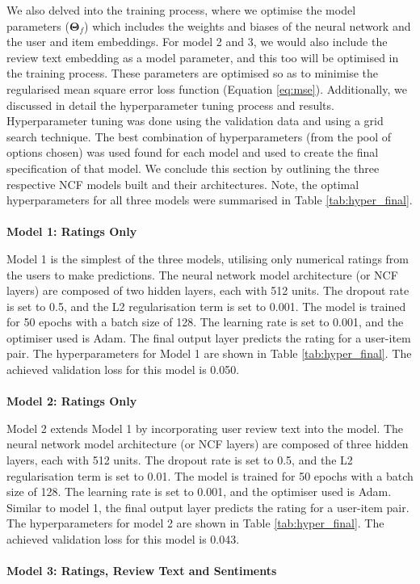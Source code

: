 We also delved into the training process, where we optimise the model parameters ($\boldsymbol{\Theta}_f$) which includes the weights and biases of the neural network and the user and item embeddings. For model 2 and 3, we would also include the review text embedding as a model parameter, and this too will be optimised in the training process. These parameters are optimised so as to minimise the regularised mean square error loss function (Equation \ref{eq:mse}). Additionally, we discussed in detail the hyperparameter tuning process and results. Hyperparameter tuning was done using the validation data and using a grid search technique. The best combination of hyperparameters (from the pool of options chosen) was used found for each model and used to create the final specification of that model. We conclude this section by outlining the three respective NCF models built and their architectures. Note, the optimal hyperparameters for all three models were summarised in Table \ref{tab:hyper_final}.
\\
\\
\textbf{Model 1: Ratings Only}

Model 1 is the simplest of the three models, utilising only numerical ratings from the users  to make predictions. The neural network model architecture (or NCF layers) are composed of two hidden layers, each with 512 units. The dropout rate is set to 0.5, and the L2 regularisation term is set to 0.001. The model is trained for 50 epochs with a batch size of 128. The learning rate is set to 0.001, and the optimiser used is Adam. The final output layer predicts the rating for a user-item pair. The hyperparameters for Model 1 are shown in Table \ref{tab:hyper_final}. The achieved validation loss for this model is 0.050.
\\
\\
\textbf{Model 2: Ratings Only}

Model 2 extends Model 1 by incorporating user review text into the model. The neural network model architecture (or NCF layers) are composed of three hidden layers, each with 512 units. The dropout rate is set to 0.5, and the L2 regularisation term is set to 0.01. The model is trained for 50 epochs with a batch size of 128. The learning rate is set to 0.001, and the optimiser used is Adam. Similar to model 1, the final output layer predicts the rating for a user-item pair. The hyperparameters for model 2 are shown in Table \ref{tab:hyper_final}. The achieved validation loss for this model is 0.043. 
\\
\\
\textbf{Model 3: Ratings, Review Text and Sentiments}

